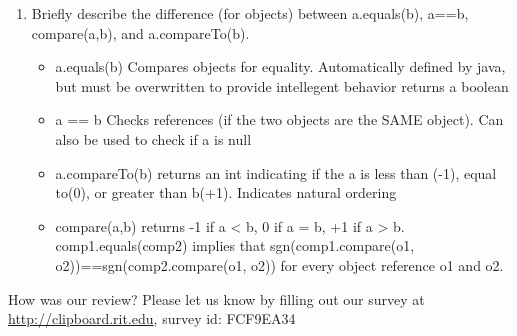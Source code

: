 \documentclass[11pt]{article}
\newenvironment{answer}{\large\lstset{basicstyle=\large}\color{white}}{}
\newenvironment{answer}{\large\lstset{basicstyle=\large}\color{red}}{}
\begin{document}
\begin{enumerate}
\item Briefly describe the difference (for objects) between a.equals(b), a==b, compare(a,b), and a.compareTo(b).
\begin{answer}
    \begin{itemize}
        \item a.equals(b) Compares objects for equality. Automatically defined by java, but must be overwritten
to provide intellegent behavior returns a boolean
    \item a == b  Checks references (if the two objects are the SAME object). Can also be used to check if a is null  
    \item a.compareTo(b) returns an int indicating if the a is less than (-1), equal to(0), or greater than b(+1). Indicates natural ordering 
    \item compare(a,b) returns -1 if a < b, 0 if a = b, +1 if a > b. comp1.equals(comp2) implies that sgn(comp1.compare(o1, o2))==sgn(comp2.compare(o1, o2)) for every object reference o1 and o2.
    \end{itemize}
\end{answer}

\end{enumerate}



\vfill
\begin{framed}
How was our review? Please let us know by filling out our survey at\\
\url{http://clipboard.rit.edu}, survey id: FCF9EA34
\end{framed}
\end{document}
